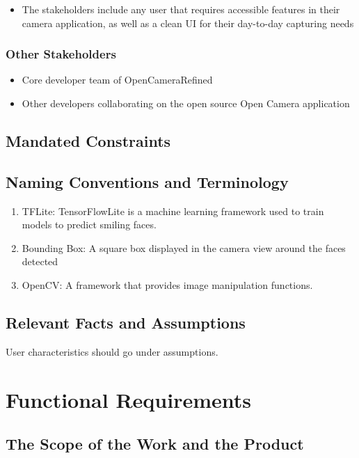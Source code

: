 \documentclass[12pt, titlepage]{article}
\begin{document}
\begin{itemize}
\item The stakeholders include any user that requires accessible features in their camera application, as well as a clean UI for their day-to-day capturing needs
\end{itemize}

\subsubsection{Other Stakeholders}

\begin{itemize}
\item Core developer team of OpenCameraRefined
\item Other developers collaborating on the open source Open Camera application
\end{itemize}

\subsection{Mandated Constraints}

\subsection{Naming Conventions and Terminology}

\begin{enumerate}
\item  TFLite:  TensorFlowLite is a machine learning framework used to train models to predict smiling faces.
\item Bounding Box:  A square box displayed in the camera view around the faces detected
\item OpenCV:  A framework that provides image manipulation functions.
\end{enumerate}

\subsection{Relevant Facts and Assumptions}

User characteristics should go under assumptions.

\section{Functional Requirements}

\subsection{The Scope of the Work and the Product}
\end{document}
